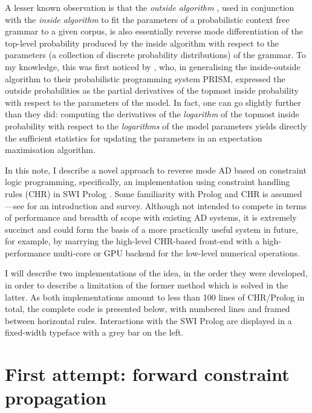 A lesser known observation is that the \emph{outside algorithm} \citep{Goodman1998},
used in conjunction with the \emph{inside algorithm} to fit the parameters of a probabilistic 
context free grammar to a given corpus, is also essentially reverse mode differentiation
of the top-level probability produced by the inside algorithm with respect to the 
parameters (a collection of discrete probability distributions) of the grammar.
To my knowledge, this was first noticed by \cite{SatoKameya2001}, who, in generalising 
the inside-outside algorithm to their probabilistic programming
system PRISM, expressed the outside probabilities as the partial derivatives
of the topmost inside probability with respect to the parameters of the model.
In fact, one can go slightly further than they did: computing the derivatives of the
\emph{logarithm} of the topmost inside probability with respect to the \emph{logarithms} of
the model parameters yields directly the sufficient statistics for updating the parameters
in an expectation maximisation algorithm.

In this note, I describe a novel approach to reverse mode AD based on constraint logic programming,
specifically, an implementation using constraint handling rules (CHR) in SWI Prolog 
\citep{Fruhwirth1998,WielemakerSchrijversTriska2012}.
Some familiarity with Prolog and CHR is assumed---see \cite{SneyersVan-WeertSchrijvers2010} for an
introduction and survey.
Although not intended to compete in terms of performance and breadth of scope with existing
AD systems, it is extremely succinct and could form the basis of a more practically
useful system in future, for example, by marrying the high-level CHR-based front-end 
with a high-performance multi-core or GPU backend for the low-level numerical 
operations.

I will describe two implementations of the idea, in the order they were developed,
in order to describe a limitation of the former method which is solved in the 
latter. As both implementations amount to less than 100 lines of CHR/Prolog in total,
the complete code is presented below, with numbered lines and framed between horizontal rules.
Interactions with the SWI Prolog are displayed in a fixed-width typeface with a grey
bar on the left.

\section{First attempt: forward constraint propagation}

